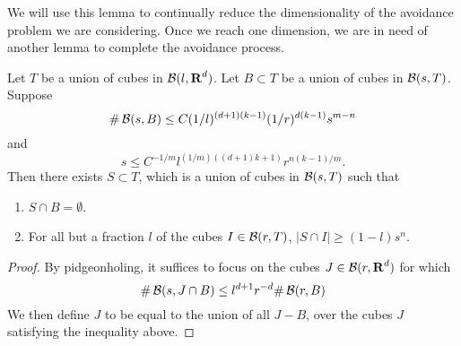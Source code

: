 We will use this lemma to continually reduce the dimensionality of the avoidance problem we are considering. Once we reach one dimension, we are in need of another lemma to complete the avoidance process.

\begin{lemma}
    Let $T$ be a union of cubes in $\operatorname{\mathcal{B}}(l,\operatorname{\mathbf{R}}^d)$. Let $B \subset T$ be a union of cubes in $\operatorname{\mathcal{B}}(s,T)$. Suppose
    \[ \# \operatorname{\mathcal{B}}(s,B) \leq C (1/l)^{(d+1)(k-1)} (1/r)^{d(k-1)} s^{m-n} \]
    and
    \[ s \leq C^{-1/m} l^{(1/m)((d+1)k + 1)} r^{n(k-1)/m}. \]
    Then there exists $S \subset T$, which is a union of cubes in $\operatorname{\mathcal{B}}(s,T)$ such that
    \begin{enumerate}
        \item $S \cap B = \emptyset$.
        \item For all but a fraction $l$ of the cubes $I \in \operatorname{\mathcal{B}}(r,T)$, $|S \cap I| \geq (1 - l) s^n$.
    \end{enumerate}
\end{lemma}
\begin{proof}
    By pidgeonholing, it suffices to focus on the cubes $J \in \operatorname{\mathcal{B}}(r,\operatorname{\mathbf{R}}^d)$ for which
    \[ \# \operatorname{\mathcal{B}}(s,J \cap B) \leq l^{d+1} r^{-d} \# \operatorname{\mathcal{B}}(r,B) \]
    We then define $J$ to be equal to the union of all $J - B$, over the cubes $J$ satisfying the inequality above.
\end{proof}

